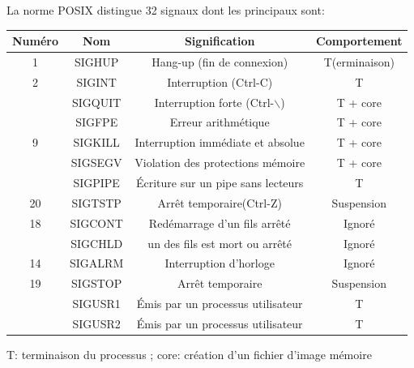 \documentclass[9pt]{beamer}
\begin{document}
\begin{frame}
La norme POSIX distingue  32 signaux dont les principaux sont:
\begin{center}

\begin{tabular}{|c|c|c|c|}
    \hline 
    Numéro & Nom & Signification & Comportement\\ 
    \hline 
    1&SIGHUP & Hang-up (fin de connexion) & T(erminaison)\\ 
    \hline 
    2 &  SIGINT & Interruption (Ctrl-C)  &T\\ 
    \hline 
    &SIGQUIT & Interruption forte (Ctrl-$\backslash$) & T + core\\ 
    \hline 
    &SIGFPE & Erreur arithmétique & T + core\\ 
    \hline 
    9 &SIGKILL & Interruption immédiate et absolue & T + core\\ 
    \hline 
    &SIGSEGV&Violation des protections mémoire &T + core\\ 
    \hline 
    &SIGPIPE &Écriture sur un pipe sans lecteurs& T\\ 
    \hline 
    20 &SIGTSTP &Arrêt temporaire(Ctrl-Z)& Suspension\\ 
    \hline 
    18 &SIGCONT& Redémarrage d’un fils arrêté & Ignoré \\ 
    \hline 
    &SIGCHLD &un des fils est mort ou arrêté & Ignoré \\ 
    \hline 
    14 &SIGALRM & Interruption d’horloge & Ignoré \\ 
    \hline 
    19 &SIGSTOP & Arrêt temporaire & Suspension \\ 
    \hline 
    &SIGUSR1 & Émis par un processus utilisateur & T \\ 
    \hline 
    &SIGUSR2 & Émis par un processus utilisateur & T \\ 
    \hline 
\end{tabular} 
\end{center}
T: terminaison du processus
; core: création d'un fichier d'image mémoire
\end{frame}
\end{document}
